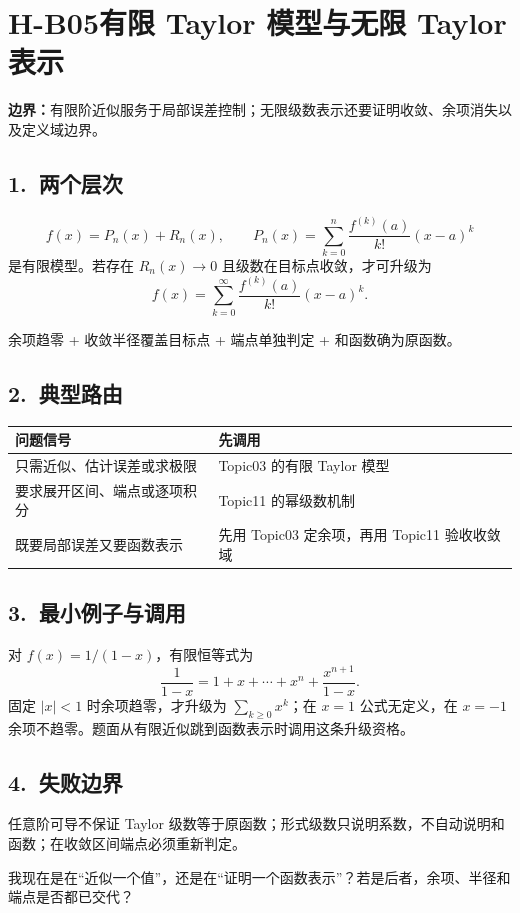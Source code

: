 \documentclass[UTF8,a4paper,10pt]{ctexart}
\begin{document}
\section*{H-B05\quad 有限 Taylor 模型与无限 Taylor 表示}
\textbf{边界：}有限阶近似服务于局部误差控制；无限级数表示还要证明收敛、余项消失以及定义域边界。
\subsection*{1.\ 两个层次}
\[
f(x)=P_n(x)+R_n(x),\qquad
P_n(x)=\sum_{k=0}^{n}\frac{f^{(k)}(a)}{k!}(x-a)^k
\]
是有限模型。若存在 $R_n(x)\to0$ 且级数在目标点收敛，才可升级为
\[
f(x)=\sum_{k=0}^{\infty}\frac{f^{(k)}(a)}{k!}(x-a)^k.
\]
\begin{tcolorbox}[title=升级资格]
余项趋零 + 收敛半径覆盖目标点 + 端点单独判定 + 和函数确为原函数。
\end{tcolorbox}
\subsection*{2.\ 典型路由}
\begin{tabularx}{\linewidth}{@{}lX@{}}
\toprule
问题信号 & 先调用\\ \midrule
只需近似、估计误差或求极限 & Topic03 的有限 Taylor 模型\\
要求展开区间、端点或逐项积分 & Topic11 的幂级数机制\\
既要局部误差又要函数表示 & 先用 Topic03 定余项，再用 Topic11 验收收敛域\\
\bottomrule
\end{tabularx}
\subsection*{3.\ 最小例子与调用}
对 $f(x)=1/(1-x)$，有限恒等式为
\[
\frac1{1-x}=1+x+\cdots+x^n+\frac{x^{n+1}}{1-x}.
\]
固定 $|x|<1$ 时余项趋零，才升级为 $\sum_{k\ge0}x^k$；在 $x=1$ 公式无定义，在 $x=-1$ 余项不趋零。题面从有限近似跳到函数表示时调用这条升级资格。

\subsection*{4.\ 失败边界}
任意阶可导不保证 Taylor 级数等于原函数；形式级数只说明系数，不自动说明和函数；在收敛区间端点必须重新判定。
\begin{tcolorbox}[title=检查句]
我现在是在“近似一个值”，还是在“证明一个函数表示”？若是后者，余项、半径和端点是否都已交代？
\end{tcolorbox}
\end{document}
